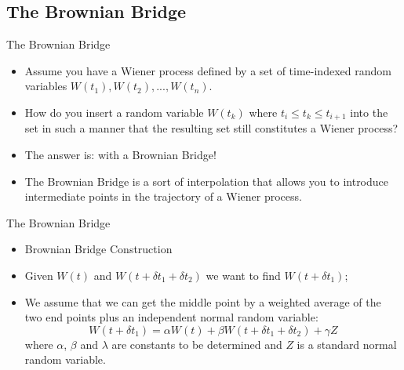\documentclass[11pt]{beamer}
\begin{document}
\subsection{The Brownian Bridge}
\begin{frame}{The Brownian Bridge}
\begin{itemize}
\item Assume you have a Wiener process defined by a set of time-indexed random variables ${W(t_1), W(t_2), ... , W(t_n)}$. 
\item How do you insert a random variable $W(t_k)$ where $t_i \le t_k \le t_{i+1}$ into the set in such a manner that the resulting set still constitutes a Wiener process?
\item The answer is: with a Brownian Bridge!
\item The Brownian Bridge is a sort of interpolation that allows you to introduce intermediate points in the trajectory of a Wiener process.
\end{itemize}
\end{frame}
\begin{frame}{The Brownian Bridge}
\begin{itemize}
\item Brownian Bridge Construction
\item Given $W(t)$ and $W(t + \delta t_1 + \delta t_2)$ we want to find $W(t + \delta t_1 )$;
\item We assume that we can get the middle point by a weighted average of the two end points plus an independent normal random variable:
$$
W(t + \delta t_1) =\alpha W(t) + \beta W(t + \delta t_1 + \delta t_2) + \gamma Z
$$
where $\alpha$, $\beta$ and $\lambda$ are constants to be determined and $Z$ is a standard normal random variable.
\end{itemize}
\end{frame}
\end{document}
